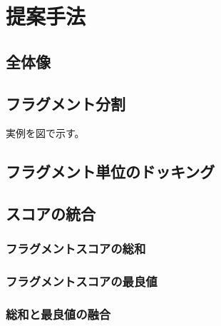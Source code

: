 \chapter{提案手法}
\section{全体像}
\section{フラグメント分割}
実例を図で示す。
\section{フラグメント単位のドッキング}
\section{スコアの統合}
\subsection{フラグメントスコアの総和}
\subsection{フラグメントスコアの最良値}
\subsection{総和と最良値の融合}